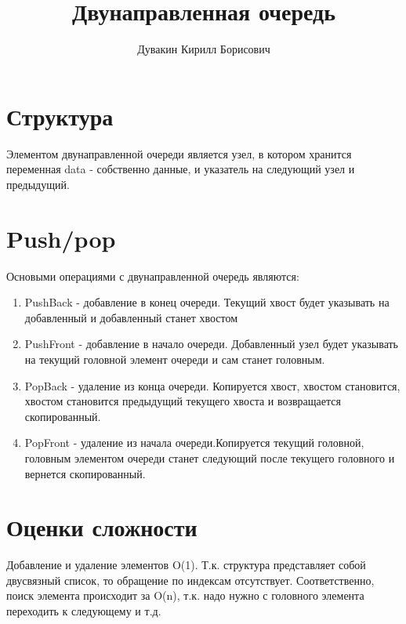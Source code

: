 \documentclass[a4paper,11pt]{report}
\title{Двунаправленная очередь}
\author{Дувакин Кирилл Борисович}
\begin{document}
\maketitle
\tableofcontents
\chapter{Структура}
Элементом двунаправленной очереди является узел, в котором хранится переменная data - собственно данные, и указатель на следующий узел и предыдущий.

\chapter{Push/pop}
Основыми операциями с двунаправленной очередь являются:
\begin{enumerate}
    \item PushBack - добавление в конец очереди.
    Текущий хвост будет указывать на добавленный и добавленный станет хвостом
    \item PushFront - добавление в начало очереди. Добавленный узел будет указывать на текущий головной элемент очереди и сам станет головным.
    \item PopBack - удаление из конца очереди. Копируется хвост, хвостом становится, хвостом становится предыдущий текущего хвоста и возвращается скопированный.
    \item PopFront - удаление из начала очереди.Копируется текущий головной, головным элементом очереди станет следующий после текущего головного и вернется скопированный. 
\end{enumerate}

\chapter{Оценки сложности}
Добавление и удаление элементов O(1). Т.к. структура представляет собой двусвязный список, то обращение по индексам отсутствует. Соответственно, поиск элемента происходит за O(n), т.к. надо нужно с головного элемента переходить к следующему и т.д. 
\end{document}
